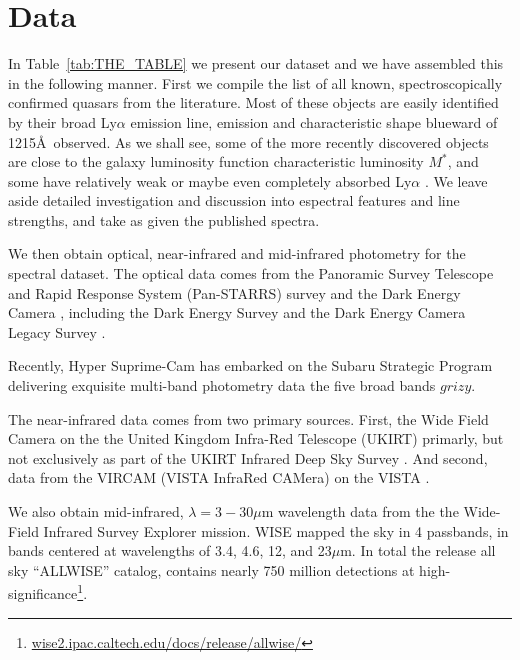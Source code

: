 \documentclass[usenatbib]{mnras}
\begin{document}
\vspace{-16pt}
\section{Data}
In Table~\ref{tab:THE_TABLE} we present our dataset and 
we have assembled this in the following manner.  First
we compile the list of all known, spectroscopically confirmed quasars
from the literature. Most of these objects are easily identified by
their broad Ly$\alpha$ emission line, \nv emission and characteristic
shape blueward of 1215\AA\ observed. As we shall see, some of the more
recently discovered objects are close to the galaxy luminosity
function characteristic luminosity $M^{*}$, and some have relatively
weak or maybe even completely absorbed Ly$\alpha$ \citep[e.g. Figures
7 and 10 in][]{Banados2016}. We leave aside detailed investigation and
discussion into espectral features and line strengths, and take as given 
the published spectra. 

We then obtain optical, near-infrared and mid-infrared photometry for the
spectral dataset. The optical data comes from the 
Panoramic Survey Telescope and Rapid Response System (Pan-STARRS) 
survey \citep{Chambers2016} and the Dark Energy Camera \citep{Flaugher2015}, 
including the Dark Energy Survey \citep[DES;][]{Flaugher2005} and 
the Dark Energy Camera Legacy Survey \citep[DECaLS]{Dey2018}. 

Recently, Hyper Suprime-Cam \citep[HSC; ][]{Miyazaki2018} has embarked
on the Subaru Strategic Program \citep[SSP; ][]{Aihara2018a}
delivering exquisite multi-band photometry data
\citep[][]{Aihara2018b} the five broad bands $grizy$.

The near-infrared data comes from two primary sources. First, the Wide
Field Camera \citep[WFCAM; ][]{Casali2007} on the the United Kingdom
Infra-Red Telescope (UKIRT) primarly, but not exclusively as part of
the UKIRT Infrared Deep Sky Survey \citep[UKIDSS; ][]{Lawrence2007}.
And second, data from the VIRCAM (VISTA InfraRed CAMera) on the VISTA
\citep[Visible and Infrared Survey Telescope for
Astronomy;][]{Emerson2006, Dalton2006}.

We also obtain mid-infrared, $\lambda=3-30\mu$m wavelength data from the
the Wide-Field Infrared Survey Explorer \citep[WISE;][]{Wright2010, Cutri2013} mission.
WISE mapped the sky in 4 passbands, in bands centered at wavelengths of 3.4, 4.6, 12, and 23$\mu$m. 
In total the release all sky ``ALLWISE'' catalog, contains nearly 750 million detections at high-significance\footnote{
\href{http://wise2.ipac.caltech.edu/docs/release/allwise/}{wise2.ipac.caltech.edu/docs/release/allwise/}}. 
\end{document}
